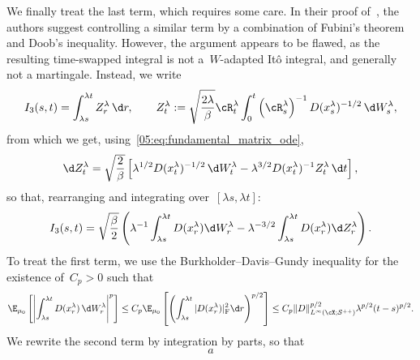 We finally treat the last term, which requires some care. In their proof of~\cite[Lemma 3.1]{WSW24}, the authors suggest controlling a similar term by a combination of Fubini's theorem and Doob's inequality. However, the argument appears to be flawed, as the resulting time-swapped integral is not a~$W$-adapted Itô integral, and generally not a martingale. Instead, we write
\begin{equation}
    I_3(s,t) = \int_{\lambda s}^{\lambda t}Z_r^\lambda\,\d r,\qquad Z_t^\lambda := \sqrt{\frac{2\lambda}{\beta}}\cR_t^\lambda \int_0^t \left(\cR_s^\lambda\right)^{-1}D(x_s^\lambda)^{-1/2}\,\d W^\lambda_s,
\end{equation}
from which we get, using~\eqref{05:eq:fundamental_matrix_ode},
\begin{equation}
    \d Z_t^\lambda = \sqrt{\frac2\beta}\left[\lambda^{1/2}D(x_t^\lambda)^{-1/2}\,\d W_t^\lambda-\lambda^{3/2}D(x_t^\lambda)^{-1}Z_t^\lambda \,\d t\right],
\end{equation}
so that, rearranging and integrating over~$[\lambda s,\lambda t]$:
\begin{equation}
    I_3(s,t) = \sqrt{\frac{\beta}{2}}\left(\lambda^{-1}\int_{\lambda s}^{\lambda t}D(x_r^\lambda)\d W^\lambda_r-\lambda^{-3/2}\int_{\lambda s}^{\lambda t}D(x_r^\lambda)\d Z_r^\lambda\right).
\end{equation}
To treat the first term, we use the Burkholder--Davis--Gundy inequality for the existence of~$C_p>0$ such that
\begin{equation}
    \E_{\mu_0}\left[\left|\int_{\lambda s}^{\lambda t}D(x_r^\lambda)\,\d W_r^\lambda\right|^p\right] \leq C_p \E_{\mu_0}\left[\left(\int_{\lambda s}^{\lambda t}|D(x_r^\lambda)|^2_{\mathrm{F}}\d r\right)^{p/2}\right]\leq C_p\|D\|_{L^\infty(\cX;\mathcal S^{++})}^{p/2}\lambda^{p/2}(t-s)^{p/2}.
\end{equation}
We rewrite the second term by integration by parts, so that
\begin{equation}
    a
\end{equation}
